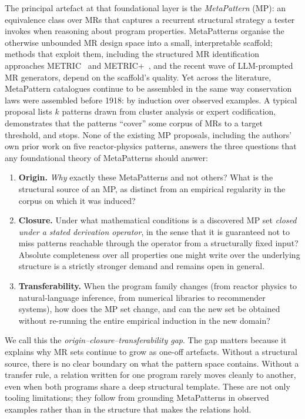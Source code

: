 \documentclass[acmsmall, screen]{acmart}
\begin{document}
The principal artefact at that foundational layer is the \emph{MetaPattern} (MP): an equivalence class over MRs that captures a recurrent structural strategy a tester invokes when reasoning about program properties. MetaPatterns organise the otherwise unbounded MR design space into a small, interpretable scaffold; methods that exploit them, including the structured MR identification approaches METRIC~\cite{ChenMETRIC2016} and METRIC+~\cite{SunMETRICplus2021}, and the recent wave of LLM-prompted MR generators, depend on the scaffold's quality. Yet across the literature, MetaPattern catalogues continue to be assembled in the same way conservation laws were assembled before 1918: by induction over observed examples. A typical proposal lists $k$ patterns drawn from cluster analysis or expert codification, demonstrates that the patterns ``cover'' some corpus of MRs to a target threshold, and stops. None of the existing MP proposals, including the authors' own prior work on five reactor-physics patterns, answers the three questions that any foundational theory of MetaPatterns should answer:

\begin{enumerate}
  \item \textbf{Origin.} \emph{Why} exactly these MetaPatterns and not others? What is the structural source of an MP, as distinct from an empirical regularity in the corpus on which it was induced?
  \item \textbf{Closure.} Under what mathematical conditions is a discovered MP set \emph{closed under a stated derivation operator}, in the sense that it is guaranteed not to miss patterns reachable through the operator from a structurally fixed input? Absolute completeness over all properties one might write over the underlying structure is a strictly stronger demand and remains open in general.
  \item \textbf{Transferability.} When the program family changes (from reactor physics to natural-language inference, from numerical libraries to recommender systems), how does the MP set change, and can the new set be obtained without re-running the entire empirical induction in the new domain?
\end{enumerate}

We call this the \emph{origin--closure--transferability gap}. The gap matters because it explains why MR sets continue to grow as one-off artefacts. Without a structural source, there is no clear boundary on what the pattern space contains. Without a transfer rule, a relation written for one program rarely moves cleanly to another, even when both programs share a deep structural template. These are not only tooling limitations; they follow from grounding MetaPatterns in observed examples rather than in the structure that makes the relations hold.
\end{document}
